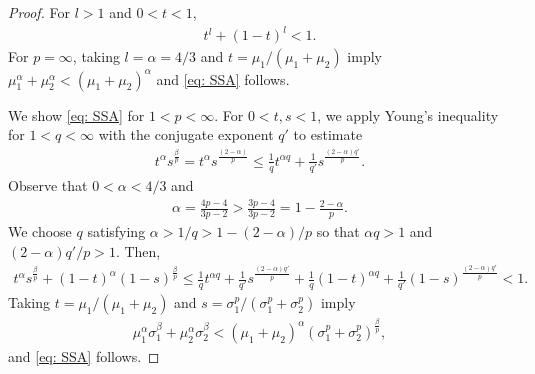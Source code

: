 \documentclass[11pt]{amsart}
\theoremstyle{definition}
\theoremstyle{definition}
\numberwithin{equation}{section}
\newcommand{\0}{\emptyset}
\begin{document}
	\begin{proof}
		For $l>1$ and $0<t<1$, 
		\begin{align*}
			t^{l}+(1-t)^{l}<1.
		\end{align*}
		For $p=\infty$, taking $l=\alpha=4/3$ and $t=\mu_1/(\mu_1+\mu_2)$ imply $\mu^{\alpha}_{1}+\mu^{\alpha}_{2}<(\mu_1+\mu_2)^{\alpha}$ and \eqref{eq: SSA} follows.
		
		We show \eqref{eq: SSA} for $1<p<\infty$. For $0<t,s<1$, we apply Young's inequality for $1<q<\infty$ with the conjugate exponent $q'$ to estimate 
		\begin{align*}
			t^{\alpha}s^{\frac{\beta}{p}}=t^{\alpha}s^{\frac{(2-\alpha)}{p}}\leq \frac{1}{q}t^{\alpha q}+\frac{1}{q'}s^{\frac{(2-\alpha)q'}{p}}.
		\end{align*}
		Observe that $0<\alpha<4/3$ and 
		\begin{align*}
			\alpha=\frac{4p-4}{3p-2}>\frac{3p-4}{3p-2}=1-\frac{2-\alpha}{p}.
		\end{align*}
		We choose $q$ satisfying $\alpha>1/q>1-(2-\alpha)/p$ so that $\alpha q>1$ and $(2-\alpha)q'/p>1$. Then, 
		\begin{align*}
			t^{\alpha}s^{\frac{\beta}{p}}+(1-t)^{\alpha}(1-s)^{\frac{\beta}{p}}\leq \frac{1}{q}t^{\alpha q}+\frac{1}{q'}s^{\frac{(2-\alpha)q'}{p}}+\frac{1}{q}(1-t)^{\alpha q}+\frac{1}{q'}(1-s)^{\frac{(2-\alpha)q'}{p}}<1.
		\end{align*}
		Taking $t=\mu_1/(\mu_1+\mu_2)$ and $s=\sigma_1^{p}/(\sigma_1^{p}+\sigma_2^{p})$ imply 
		\begin{align*}
			\mu_1^{\alpha}\sigma_1^{\beta}+\mu_2^{\alpha}\sigma_2^{\beta}
			<(\mu_1+\mu_2)^{\alpha}(\sigma_1^{p}+\sigma_2^{p})^{\frac{\beta}{p}},
		\end{align*}
		and \eqref{eq: SSA} follows.
	\end{proof}
	
	
	
\end{document}
